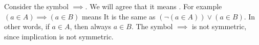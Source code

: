 
Consider the symbol $\implies$.
We will agree that it means .
For example $(a \in A) \implies (a \in B)$ means 
It is the same as $(\neg(a \in A)) \lor (a \in B)$.
In other words, if $a \in A$, then always $a \in B$.
The symbol $\implies$ is not symmetric, since implication is not symmetric.

%
%
%
%
%
